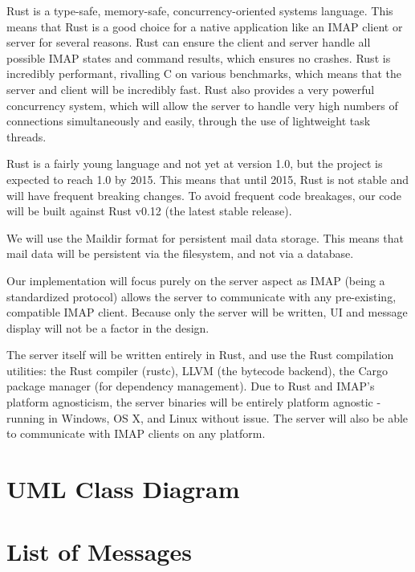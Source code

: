 \documentclass[a4paper,12pt]{article}
\begin{document}
Rust is a type-safe, memory-safe, concurrency-oriented systems language.
This means that Rust is a good choice for a native application like an IMAP client or server for several reasons.
Rust can ensure the client and server handle all possible IMAP states and command results, which ensures no crashes.
Rust is incredibly performant, rivalling C on various benchmarks, which means that the server and client will be incredibly fast.
Rust also provides a very powerful concurrency system, which will allow the server to handle very high numbers of connections simultaneously and easily, through the use of lightweight task threads.

Rust is a fairly young language and not yet at version 1.0, but the project is expected to reach 1.0 by 2015.
This means that until 2015, Rust is not stable and will have frequent breaking changes.
To avoid frequent code breakages, our code will be built against Rust v0.12 (the latest stable release).

We will use the Maildir format for persistent mail data storage.
This means that mail data will be persistent via the filesystem, and not via a database.

Our implementation will focus purely on the server aspect as IMAP (being a standardized protocol) allows the server to communicate with any pre-existing, compatible IMAP client.
Because only the server will be written, UI and message display will not be a factor in the design.

The server itself will be written entirely in Rust, and use the Rust compilation utilities: the Rust compiler (rustc), LLVM (the bytecode backend), the Cargo package manager (for dependency management).
Due to Rust and IMAP's platform agnosticism, the server binaries will be entirely platform agnostic - running in Windows, OS X, and Linux without issue.
The server will also be able to communicate with IMAP clients on any platform.

\section{UML Class Diagram}

\section{List of Messages}
\end{document}
